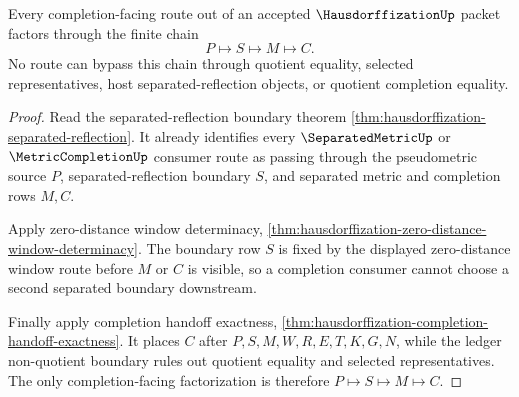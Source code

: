 \begin{theorem}
\label{thm:hausdorffization-separated-completion-factorization}
Every completion-facing route out of an accepted $\HausdorffizationUp$ packet factors through the finite chain
$$
P \longmapsto S \longmapsto M \longmapsto C .
$$
No route can bypass this chain through quotient equality, selected representatives, host separated-reflection objects, or quotient completion equality.
\end{theorem}
\begin{proof}
Read the separated-reflection boundary theorem \autoref{thm:hausdorffization-separated-reflection}. It already identifies every $\SeparatedMetricUp$ or $\MetricCompletionUp$ consumer route as passing through the pseudometric source $P$, separated-reflection boundary $S$, and separated metric and completion rows $M,C$.

Apply zero-distance window determinacy, \autoref{thm:hausdorffization-zero-distance-window-determinacy}. The boundary row $S$ is fixed by the displayed zero-distance window route before $M$ or $C$ is visible, so a completion consumer cannot choose a second separated boundary downstream.

Finally apply completion handoff exactness, \autoref{thm:hausdorffization-completion-handoff-exactness}. It places $C$ after $P,S,M,W,R,E,T,K,G,N$, while the ledger non-quotient boundary rules out quotient equality and selected representatives. The only completion-facing factorization is therefore $P \longmapsto S \longmapsto M \longmapsto C$.
\end{proof}

